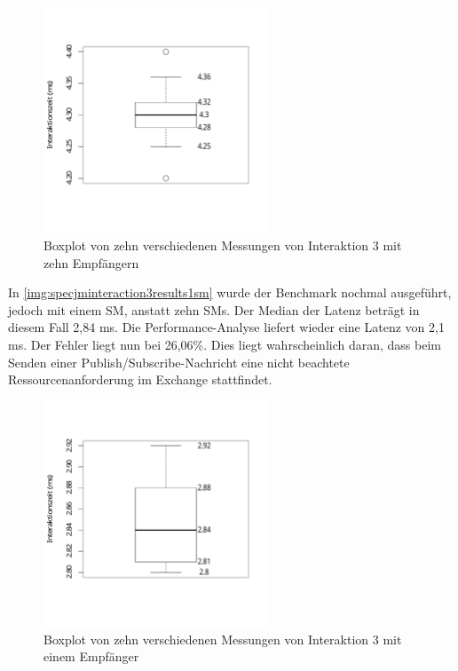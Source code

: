 \begin{figure}
\center
  \includegraphics[width=0.6\textwidth]{images/evaluation/specjmsresults/interaktion3-10SM.pdf}
  \caption{Boxplot von zehn verschiedenen Messungen von Interaktion 3 mit zehn Empfängern}
  \label{img:specjminteraction3results10sm}
\end{figure}

In \autoref{img:specjminteraction3results1sm} wurde der Benchmark nochmal ausgeführt, jedoch mit einem SM, anstatt zehn SMs. Der Median der Latenz beträgt in diesem Fall 2,84 ms. Die Performance-Analyse liefert wieder eine Latenz von 2,1 ms. Der Fehler liegt nun bei 26,06\%. Dies liegt wahrscheinlich daran, dass beim Senden einer Publish/Subscribe-Nachricht eine nicht beachtete Ressourcenanforderung im Exchange stattfindet.
\begin{figure}
\center
  \includegraphics[width=0.6\textwidth]{images/evaluation/specjmsresults/interaktion3-1SM.pdf}
  \caption{Boxplot von zehn verschiedenen Messungen von Interaktion 3 mit einem Empfänger}
  \label{img:specjminteraction3results1sm}
\end{figure}



